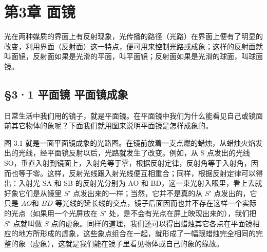 \chapter{第3章 面镜}

光在两种媒质的界面上有反射现象，光传播的路径（光路）在界面上便有了明显的改变，利用界面（反射面）这一特点，便可用来控制光路或成象；这样的反射面就叫面镜，反射面如果是光滑的平面，叫平面镜；反射面如果是光滑的球面，叫球面镜。

\section{§3·1 平面镜
平面镜成象}

日常生活中我们用的镜子，就是平面镜。在平面镜中我们为什么能看见自己或镜面前其它物体的象呢？下面我们就用图来说明平面镜是怎样成象的。

图 3.1
就是一面平面镜成象的光路图。在镜前放着一支点燃的蜡烛，从蜡烛火焰发出的光线，经平面镜反射以后，光路就发生了改变。例如，从
S 点发出的光线
SO，垂直入射到镜面上，入射角等于零，根据反射定律，反射角等于入射角，因而也等于零。这样，反射光线跟入射光线便互相重合；同样，根据反射定律可以得出：入射光
SA 和 SB 的反射光分别为 AO 和
BD，这一束光射入眼里，看上去就好象它们是从镜里 \(S'\)
点发出来的一样；当然，它并不是真的从 \(S'\) 点发出的，它只是 \(AO\)和
\(BD\)
等光线的延长线的交点，镜子后面因而也并不存在这样一个实际的光点（如果用一个光屏放在
\(S'\) 处，是不会有光点在屏上映现出来的），我们把 \(S'\) 点就叫做 \(S\)
点的虚象。同样的道理，我们还可以得出蜡烛其它各点在平面镜相应的地方所形成的虚象，这些象点组合在一起，就形成了一幅跟蜡烛完全相同的完整的象（虚象），这就是我们能在镜子里看见物体或自己的象的缘故。

